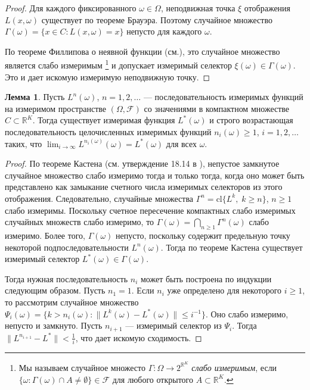 \documentclass[a4paper,12pt,russian]{article} %
\theoremstyle{definition}
\newtheorem{lemma}{Лемма}
\newcommand{\F}{\mathcal{F}}
\newcommand{\R}{\mathbb{R}}
\begin{document}
\begin{proof}
Для каждого фиксированного $\omega\in\Omega$, неподвижная точка $\xi$ отображения $L(x,\omega)$ существует по теореме Брауэра.
Поэтому случайное множество $\Gamma(\omega) = \{x\in C : L(x,\omega)=x\}$ непусто для каждого $\omega$.

По теореме Филлипова о неявной функции (см.\cite[ Гл.~18.3]{Aliprantis2006}), это случайное множество является слабо измеримым \footnote{Мы называем случайное множесто $\Gamma\colon\Omega\to 2^{\R^K}$ \emph{слабо измеримым}, если  $\{\omega : \Gamma(\omega)\cap A \neq \emptyset\} \in \F$ для любого открытого $A\subset \R^K$.} и допускает измеримый селектор $\xi(\omega)\in \Gamma(\omega)$. Это и дает искомую измеримую неподвижную точку. 
\end{proof}


\begin{lemma}
\label{lemma2-convergent-subsequence}
Пусть $L^{n}(\omega)$, $n=1,2,\dots$ — последовательность измеримых функций на измеримом пространстве $(\Omega,\F)$ со значениями в компактном множестве $C\subset\R^K$.
Тогда существует измеримая функция $L^*(\omega)$ и строго возрастающая последовательность целочисленных измеримых функций $n_i(\omega)\ge 1$, $i=1,2,\dots$ таких, что $\lim_{i\to\infty}L^{n_i(\omega)}(\omega) = L^*(\omega)$ для всех $\omega$. 
\end{lemma}


\begin{proof}
По теореме Кастена (см. утверждение 18.14 в \cite{Aliprantis2006}), непустое замкнутое случайное множество слабо измеримо тогда и только тогда, когда оно может быть представлено как замыкание счетного числа измеримых селекторов из этого отображения.
Следовательно, случайные множества $\Gamma^n = \mathrm{cl}\{L^k,\; k\ge n\}$, $n\ge1$ слабо измеримы.
Поскольку счетное пересечение компактных слабо измеримых случайных множеств слабо измеримо, то $\Gamma(\omega) = \bigcap_{n\ge 1}\Gamma^n(\omega)$ слабо измеримо.
Более того, $\Gamma(\omega)$ непусто, поскольку содержит предельную точку некоторой подпоследовательности $L^n(\omega)$.
Тогда по теореме Кастена существует измеримый селектор $L^*(\omega) \in \Gamma(\omega)$.

Тогда нужная последовательность $n_i$ может быть построена по индукции следующим образом.
Пусть $n_1=1$.
Если $n_i$ уже определено для некоторого $i\ge 1$, то рассмотрим случайное множество $\Psi_i(\omega) = \{k> n_i(\omega) : \|L^k(\omega) - L^*(\omega)\| \le i^{-1}\}$. Оно слабо измеримо, непусто и замкнуто.
Пусть $n_{i+1}$ — измеримый селектор из $\Psi_i$.
Тогда $\|L^{n_{i+1}} - L^*\| < \frac{1}{i}$, что дает искомую сходимость.
\end{proof}
\end{document}
